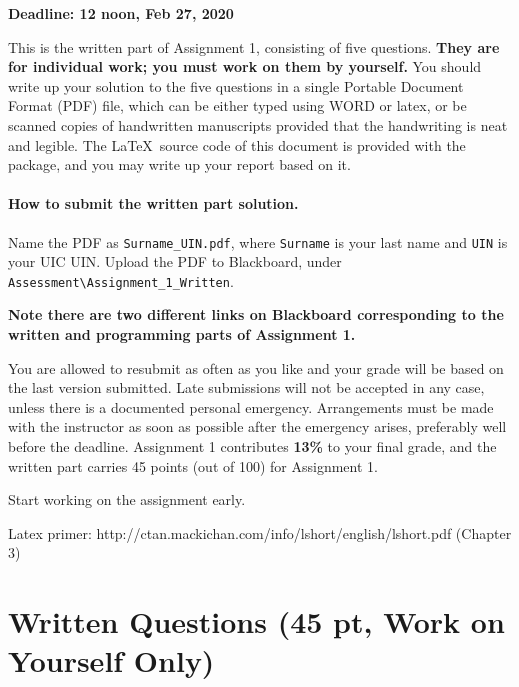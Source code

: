 \documentclass[11pt]{report}
\begin{document}
\maketitle

{\bf Deadline: 12 noon, Feb 27, 2020}

This is the written part of Assignment 1, consisting of five questions.
{\bf They are for individual work; you must work on them by yourself.}
You should write up your solution to the five questions in a single Portable Document Format (PDF) file,
which can be either typed using WORD or latex, 
or be scanned copies of handwritten manuscripts provided that the handwriting is neat and legible.  
The \LaTeX\ source code of this document is provided with the package, and you may write up your report based on it.

\paragraph{How to submit the written part solution.}
Name the PDF as \verb#Surname_UIN.pdf#, 
where \verb#Surname# is your last name and \verb#UIN# is your UIC UIN.  
Upload the PDF to Blackboard, under \verb#Assessment\Assignment_1_Written#.

{\bf Note there are two different links on Blackboard corresponding to the written and programming parts of Assignment 1.}

You are allowed to resubmit as often as you like and your grade will be based on the last version submitted.
Late submissions will not be accepted in any case, 
unless there is a documented personal emergency.  
Arrangements must be made with the instructor as soon as possible after the emergency arises,
preferably well before the deadline.
Assignment 1 contributes {\bf 13\%} to your final grade,
and the written part carries 45 points (out of 100) for Assignment 1.


Start working on the assignment early.

Latex primer: http://ctan.mackichan.com/info/lshort/english/lshort.pdf (Chapter 3)

\vspace{3em}


\section*{Written Questions (45 pt, Work on Yourself Only)}
\end{document}
